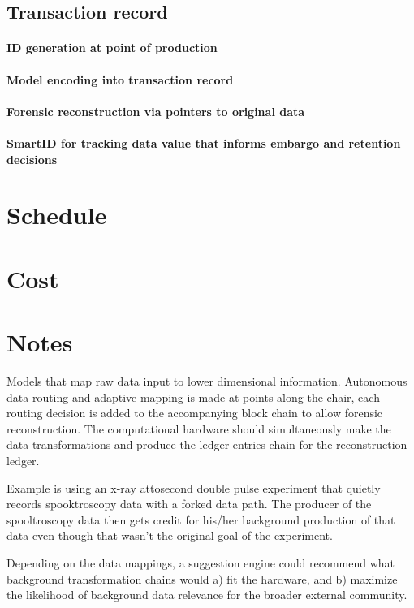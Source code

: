 \documentclass{article}
\begin{document}
\subsection{Transaction record}
\paragraph{ID generation at point of production}
\paragraph{Model encoding into transaction record}
\paragraph{Forensic reconstruction via pointers to original data}
\paragraph{SmartID for tracking data value that informs embargo and retention decisions}

\section{Schedule}

\section{Cost}

\pagebreak
\section{Notes}

Models that map raw data input to lower dimensional information. Autonomous data routing and adaptive mapping is made at points along the chair, each routing decision is added to the accompanying block chain to allow forensic reconstruction. The computational hardware should simultaneously make the data transformations and produce the ledger entries chain for the reconstruction ledger.


Example is using an x-ray attosecond double pulse experiment that quietly records spooktroscopy data with a forked data path. The producer of the spooltroscopy data then gets credit for his/her background production of that data even though that wasn’t the original goal of the experiment.

Depending on the data mappings, a suggestion engine could recommend what background transformation chains would a) fit the hardware, and b) maximize the likelihood of background data relevance for the broader external community.
\end{document}
